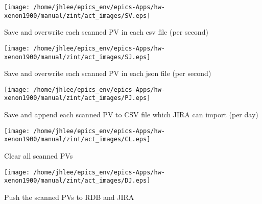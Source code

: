 \noindent
\vspace{1.4cm}
\begin{minipage}{.2\textwidth}
\begin{center}
\texttt{[image: /home/jhlee/epics\_env/epics-Apps/hw-xenon1900/manual/zint/act\_images/SV.eps]}
\end{center}
\end{minipage}
\begin{minipage}{.7\textwidth}
Save and overwrite each scanned PV in each csv file (per second)
\end{minipage}


\noindent
\vspace{1.4cm}
\begin{minipage}{.2\textwidth}
\begin{center}
\texttt{[image: /home/jhlee/epics\_env/epics-Apps/hw-xenon1900/manual/zint/act\_images/SJ.eps]}
\end{center}
\end{minipage}
\begin{minipage}{.7\textwidth}
Save and overwrite each scanned PV in each json file (per second)
\end{minipage}


\noindent
\vspace{1.4cm}
\begin{minipage}{.2\textwidth}
\begin{center}
\texttt{[image: /home/jhlee/epics\_env/epics-Apps/hw-xenon1900/manual/zint/act\_images/PJ.eps]}
\end{center}
\end{minipage}
\begin{minipage}{.7\textwidth}
Save and append each scanned PV to CSV file which JIRA can import  (per day)
\end{minipage}


\noindent
\vspace{1.4cm}
\begin{minipage}{.2\textwidth}
\begin{center}
\texttt{[image: /home/jhlee/epics\_env/epics-Apps/hw-xenon1900/manual/zint/act\_images/CL.eps]}
\end{center}
\end{minipage}
\begin{minipage}{.7\textwidth}
Clear all scanned PVs
\end{minipage}


\noindent
\vspace{1.4cm}
\begin{minipage}{.2\textwidth}
\begin{center}
\texttt{[image: /home/jhlee/epics\_env/epics-Apps/hw-xenon1900/manual/zint/act\_images/DJ.eps]}
\end{center}
\end{minipage}
\begin{minipage}{.7\textwidth}
Push the scanned PVs to RDB and JIRA
\end{minipage}


